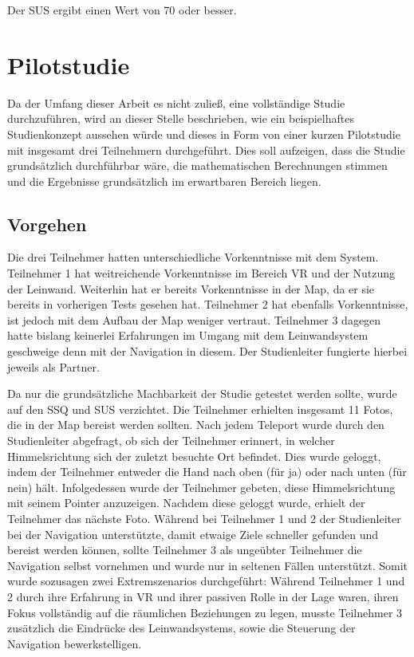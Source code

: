 \begin{hypothesis}
\label{hyp:test}
Der SUS ergibt einen Wert von 70 oder besser.
\end{hypothesis}


\section{Pilotstudie}

Da der Umfang dieser Arbeit es nicht zuließ, eine vollständige Studie durchzuführen, wird an dieser Stelle beschrieben, wie ein beispielhaftes Studienkonzept aussehen würde und dieses in Form von einer kurzen Pilotstudie mit insgesamt drei Teilnehmern durchgeführt. Dies soll aufzeigen, dass die Studie grundsätzlich durchführbar wäre, die mathematischen Berechnungen stimmen und die Ergebnisse grundsätzlich im erwartbaren Bereich liegen.

\subsection{Vorgehen}
Die drei Teilnehmer hatten unterschiedliche Vorkenntnisse mit dem System. Teilnehmer 1 hat weitreichende Vorkenntnisse im Bereich VR und der Nutzung der Leinwand. Weiterhin hat er bereits Vorkenntnisse in der Map, da er sie bereits in vorherigen Tests gesehen hat. Teilnehmer 2 hat ebenfalls Vorkenntnisse, ist jedoch mit dem Aufbau der Map weniger vertraut. Teilnehmer 3 dagegen hatte bislang keinerlei Erfahrungen im Umgang mit dem Leinwandsystem geschweige denn mit der Navigation in diesem. Der Studienleiter fungierte hierbei jeweils als Partner.

Da nur die grundsätzliche Machbarkeit der Studie getestet werden sollte, wurde auf den SSQ und SUS verzichtet. Die Teilnehmer erhielten insgesamt 11 Fotos, die in der Map bereist werden sollten. Nach jedem Teleport wurde durch den Studienleiter abgefragt, ob sich der Teilnehmer erinnert, in welcher Himmelsrichtung sich der zuletzt besuchte Ort befindet. Dies wurde geloggt, indem der Teilnehmer entweder die Hand nach oben (für ja) oder nach unten (für nein) hält.
Infolgedessen wurde der Teilnehmer gebeten, diese Himmelsrichtung mit seinem Pointer anzuzeigen. Nachdem diese geloggt wurde, erhielt der Teilnehmer das nächste Foto. Während bei Teilnehmer 1 und 2 der Studienleiter bei der Navigation unterstützte, damit etwaige Ziele schneller gefunden und bereist werden können, sollte Teilnehmer 3 als ungeübter Teilnehmer die Navigation selbst vornehmen und wurde nur in seltenen Fällen unterstützt.
Somit wurde sozusagen zwei Extremszenarios durchgeführt: Während Teilnehmer 1 und 2 durch ihre Erfahrung in VR und ihrer passiven Rolle in der Lage waren, ihren Fokus vollständig auf die räumlichen Beziehungen zu legen, musste Teilnehmer 3 zusätzlich die Eindrücke des Leinwandsystems, sowie die Steuerung der Navigation bewerkstelligen.

